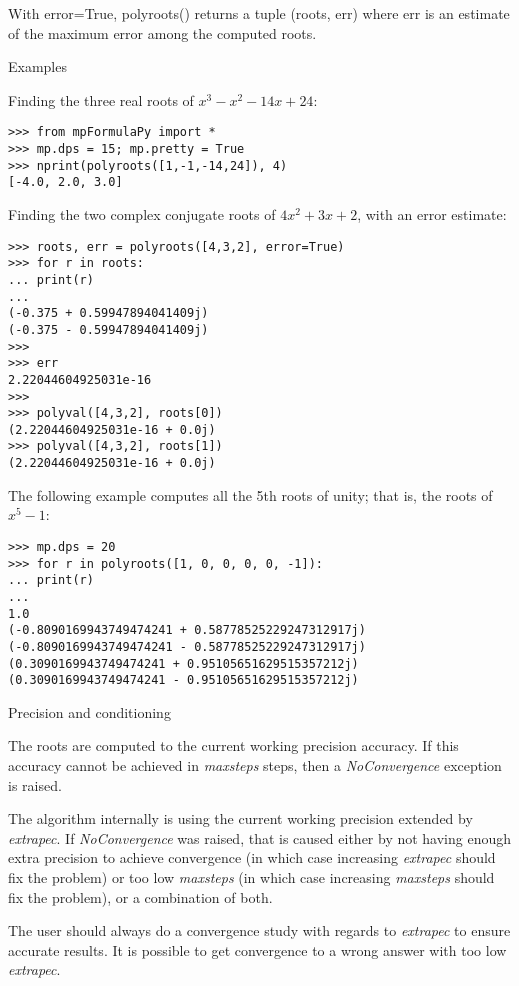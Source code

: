 With error=True, polyroots() returns a tuple (roots, err) where err is an estimate of the maximum error among the computed roots.

\vpara
Examples

Finding the three real roots of $x^3-x^2-14x+24$:

\begin{lstlisting}
>>> from mpFormulaPy import *
>>> mp.dps = 15; mp.pretty = True
>>> nprint(polyroots([1,-1,-14,24]), 4)
[-4.0, 2.0, 3.0]
\end{lstlisting}

Finding the two complex conjugate roots of $4x^2+3x+2$, with an error estimate:

\begin{lstlisting}
>>> roots, err = polyroots([4,3,2], error=True)
>>> for r in roots:
... print(r)
...
(-0.375 + 0.59947894041409j)
(-0.375 - 0.59947894041409j)
>>>
>>> err
2.22044604925031e-16
>>>
>>> polyval([4,3,2], roots[0])
(2.22044604925031e-16 + 0.0j)
>>> polyval([4,3,2], roots[1])
(2.22044604925031e-16 + 0.0j)
\end{lstlisting}

The following example computes all the 5th roots of unity; that is, the roots of $x^5-1$:

\begin{lstlisting}
>>> mp.dps = 20
>>> for r in polyroots([1, 0, 0, 0, 0, -1]):
... print(r)
...
1.0
(-0.8090169943749474241 + 0.58778525229247312917j)
(-0.8090169943749474241 - 0.58778525229247312917j)
(0.3090169943749474241 + 0.95105651629515357212j)
(0.3090169943749474241 - 0.95105651629515357212j)
\end{lstlisting}

Precision and conditioning

The roots are computed to the current working precision accuracy. If this accuracy cannot be achieved in \textit{maxsteps} steps, then a \textit{NoConvergence} exception is raised.

The algorithm internally is using the current working precision extended by \textit{extrapec}. If \textit{NoConvergence} was raised, that is caused either by not having enough extra precision to achieve convergence (in which case increasing \textit{extrapec} should fix the
problem) or too low \textit{maxsteps} (in which case increasing \textit{maxsteps} should fix the problem), or a combination of both.

The user should always do a convergence study with regards to \textit{extrapec} to ensure accurate results. It is possible to get convergence to a wrong answer with too low \textit{extrapec}.

